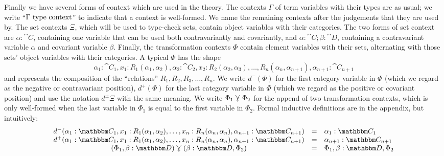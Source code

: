 \documentclass{llncs}
\begin{document}
Finally we have several forms of context which are used in the theory.
The contexts $\Gamma$ of term variables with their types are as usual;
we write ``${\Gamma \,\,\textrm{type context}}$'' to indicate that a context is well-formed.
We name the remaining contexts after the judgements that they are used
by.  The set contexts $\Xi$, which will be used
to type-check sets, contain object variables with their categories. The
two forms of set context are $\alpha : \cat C$, containing one variable
that can be used both contravariantly and covariantly, and $\alpha :
\cat C ; \beta : \cat D$, containing a contravariant variable $\alpha$
and covariant variable $\beta$.  Finally, the transformation contexts
$\Phi$ contain element variables with their sets, alternating with those
sets' object variables with their categories.  A typical $\Phi$ has the
shape
\[
\alpha_1 : \cat C_1, x_1:R_1(\alpha_1,\alpha_2), \alpha_2 : \cat C_2,
x_2:R_2(\alpha_2,\alpha_3), \ldots, R_n(\alpha_n,\alpha_{n+1}),
\alpha_{n+1} : \cat C_{n+1}
\]
and represents the composition of the ``relations'' $R_1, R_2, R_3,
\ldots, R_n$.  We write $d^-(\Phi)$ for the first category variable in
$\Phi$ (which we regard as the negative or contravariant position),
$d^+(\Phi)$ for the last category variable in $\Phi$ (which we regard
as the positive or covariant position) and use the notation $d^\pm\Xi$
with the same meaning. We write $\Phi_1 \curlyveedownarrow \Phi_2$ for the append
of two transformation contexts, which is only well-formed when the
last variable in $\Phi_1$ is equal to the first variable in
$\Phi_2$. Formal inductive definitions are in the appendix, but
intuitively:
\[
\begin{array}{ccl}
d^-(\alpha_1 : \cat C_1, x_1:R_1(\alpha_1,\alpha_2), \ldots, x_n:R_n(\alpha_n,\alpha_n), \alpha_{n+1} : \cat C_{n+1}) & = & \alpha_1 : \cat C_1\\
d^+(\alpha_1 : \cat C_1, x_1:R_1(\alpha_1,\alpha_2), \ldots, x_n:R_n(\alpha_n,\alpha_n), \alpha_{n+1} : \cat C_{n+1}) & = & \alpha_{n+1}:\cat C_{n+1}\\
(\Phi_1,\beta:\cat D) \jnctx (\beta:\cat D, \Phi_2) & = & \Phi_1, \beta : \cat D, \Phi_2
\end{array}
\]
\end{document}
